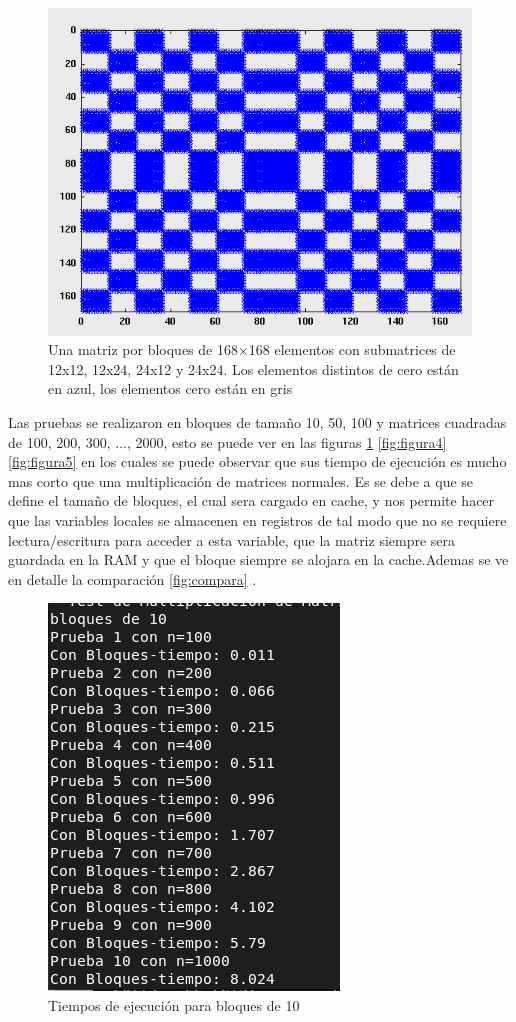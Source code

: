 \documentclass{article}
\begin{document}
\begin{enumerate}
  \begin{figure}[h]
    \centering
   \includegraphics[width=0.5\linewidth]{imagenes/BlockMatrix168square.png}
   \caption{Una matriz por bloques de 168×168 elementos con submatrices de 12x12, 12x24, 24x12 y 24x24. Los elementos distintos de cero están en azul, los elementos cero están en gris}
 
\end{figure}

  

  Las pruebas se realizaron en  bloques de tamaño 10, 50, 100 y matrices cuadradas de 100, 200, 300, ..., 2000,
  esto se puede ver en las figuras \ref{fig:figura3} \ref{fig:figura4} \ref{fig:figura5}  en los cuales se puede observar que sus tiempo de ejecución es mucho mas corto que una multiplicación de matrices normales. Es se debe a que se define
  el tamaño de bloques, el cual sera cargado en cache, y nos permite hacer que las variables locales
  se almacenen en registros de tal modo que no se requiere lectura\slash escritura para acceder a esta
  variable, que la matriz siempre sera guardada en la RAM y que el bloque siempre se alojara en
  la cache.Ademas se ve en detalle la comparación \ref{fig:compara} .



  \begin{figure}[h!]
    \centering
   \includegraphics[width=0.5\linewidth]{imagenes/Captura de pantalla de 2023-09-24 21-06-50.png}
   \caption{Tiempos de ejecución para bloques de 10}
   \label{fig:figura3}
\end{figure}


\end{enumerate}
\end{document}
